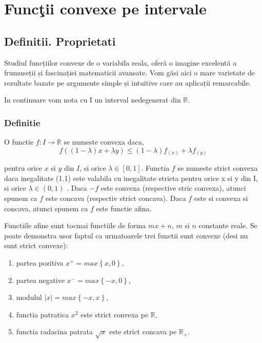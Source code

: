 \documentclass[a4paper,12pt,oneside]{report}
\begin{document}
\maketitle

\tableofcontents

%
%
%
%
\chapter{Func\c tii convexe pe intervale}

\section{Definitii. Proprietati}

Studiul funcțiilor convexe de o variabila reala, oferă o imagine excelentă a frumuseții și fascinației matematicii avansate. Vom găsi aici o mare varietate de rezultate bazate pe argumente simple și intuitive care au aplicații remarcabile.

In continuare vom nota cu I un interval nedegenerat din \(\mathbb{R}\).

\subsection{Definitie}

O functie \(f: I \rightarrow \mathbb{R}\) se numeste convexa daca,
\begin{displaymath}
f \left ( \left ( 1 - \lambda  \right )x + \lambda y \right )\leq \left ( 1 - \lambda  \right ) f_{\left ( x \right )} + \lambda f_{\left ( y \right )} 	\label{eq:1.1} \tag{1.1}
\end{displaymath}

pentru orice \(x\) si \(y\) din \(I\), si orice \(\lambda \in \left [ 0,1 \right ]\). Functia \(f\) se numeste strict convexa daca inegalitate (1.1) este valabila cu inegalitate stricta pentru orice x si y din I, si orice  \(\lambda \in \left ( 0,1 \right )\) . Daca \(-f\) este convexa (respective stric convexa), atunci spunem ca \(f\) este concava (respectiv strict concava). Daca \(f\) este si convexa si concava, atunci spunem ca \(f\) este functie afina. 


Functiile afine sunt tocmai functiile de forma \(mx + n\),  \(m\) si \(n\) constante reale.
Se poate demonstra usor faptul ca urmatoarele trei functii sunt convexe (desi nu sunt strict convexe):
\begin{enumerate}
  \item partea pozitiva \(x^{+} = max \left \{ x,0 \right \}\),
  \item partea negative \(x^{-} = max \left \{ -x,0 \right \}\), 
  \item modulul \(\left | x \right | = max \left \{ -x,x \right \}\),
  \item functia patratica \(x^{2}\)  este strict convexa pe \(\mathbb{R}\),
  \item functia radacina patrata \(\sqrt{x}\) este strict concava pe \(\mathbb{R}_{+}\). 
\end{enumerate}
\end{document}
